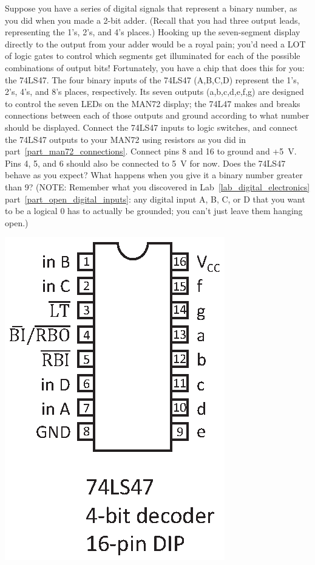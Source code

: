 \begin{enumerate}


\begin{minipage}{.70\textwidth}

\item Suppose you have a series of digital signals that represent a binary number, as you did when you made a 2-bit adder.  (Recall that you had three output leads, representing the 1's, 2's, and 4's places.) Hooking up the seven-segment display directly to the output from your adder would be a royal pain; you'd need a LOT of logic gates to control which segments get illuminated for each of the possible combinations of output bits!  Fortunately, you have a chip that does this for you: the 74LS47.  The four binary inputs of the 74LS47 (A,B,C,D) represent the 1's, 2's, 4's, and 8's places, respectively.  Its seven outputs (a,b,c,d,e,f,g) are designed to control the seven LEDs on the MAN72 display; the 74L47 makes and breaks connections between each of those outputs and ground according to what number should be displayed.  Connect the 74LS47 inputs to logic switches, and connect the 74LS47 outputs to your MAN72 using resistors as you did in part~\ref{part_man72_connections}.  Connect pins 8 and 16 to ground and +5~V.  Pins 4, 5, and 6 should also be connected to 5~V for now.   Does the 74LS47 behave as you expect?  What happens when you give it a binary number greater than 9?  (NOTE: Remember what you discovered in Lab~\ref{lab_digital_electronics} part~\ref{part_open_digital_inputs}: any digital input A, B, C, or D that you want to be a logical 0 has to actually be grounded; you can't just leave them hanging open.)  
\end{minipage}
\begin{minipage}{.28\textwidth}
\includegraphics[scale=0.8]{appendices/pinouts/74LS47.eps}
\end{minipage}



\end{enumerate}
